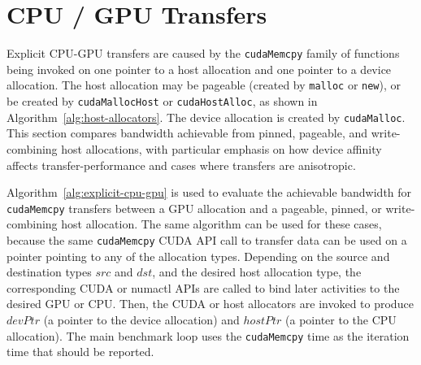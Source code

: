 \section{CPU / GPU Transfers}
\label{sec:explicit-cpu-gpu}

Explicit CPU-GPU transfers are caused by the \texttt{cudaMemcpy} family of functions being invoked on one pointer to a host allocation and one pointer to a device allocation.
The host allocation may be pageable (created by \texttt{malloc} or \texttt{new}), or be created by \texttt{cudaMallocHost} or \texttt{cudaHostAlloc}, as shown in Algorithm~\ref{alg:host-allocators}.
The device allocation is created by \texttt{cudaMalloc}.
This section compares bandwidth achievable from pinned, pageable, and write-combining host allocations, with particular emphasis on how device affinity affects transfer-performance and cases where transfers are anisotropic.

Algorithm~\ref{alg:explicit-cpu-gpu} is used to evaluate the achievable bandwidth for \texttt{cudaMemcpy} transfers between a GPU allocation and a pageable, pinned, or write-combining host allocation. 
The same algorithm can be used for these cases, because the same \texttt{cudaMemcpy} CUDA API call to transfer data can be used on a pointer pointing to any of the allocation types.
Depending on the source and destination types $src$ and $dst$, and the desired host allocation type, the corresponding CUDA or numactl APIs are called to bind later activities to the desired GPU or CPU.
Then, the CUDA or host allocators are invoked to produce $devPtr$ (a pointer to the device allocation) and $hostPtr$ (a pointer to the CPU allocation).
The main benchmark loop uses the \texttt{cudaMemcpy} time as the iteration time that should be reported.

